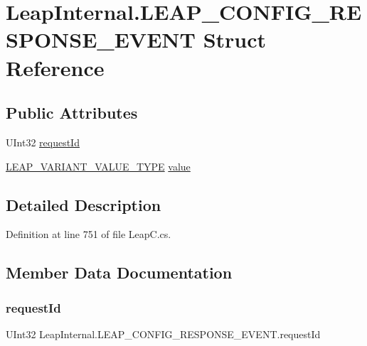 \hypertarget{struct_leap_internal_1_1_l_e_a_p___c_o_n_f_i_g___r_e_s_p_o_n_s_e___e_v_e_n_t}{}\section{Leap\+Internal.\+L\+E\+A\+P\+\_\+\+C\+O\+N\+F\+I\+G\+\_\+\+R\+E\+S\+P\+O\+N\+S\+E\+\_\+\+E\+V\+E\+NT Struct Reference}
\label{struct_leap_internal_1_1_l_e_a_p___c_o_n_f_i_g___r_e_s_p_o_n_s_e___e_v_e_n_t}
\subsection*{Public Attributes}
\begin{DoxyCompactItemize}
\item 
U\+Int32 \mbox{\hyperlink{struct_leap_internal_1_1_l_e_a_p___c_o_n_f_i_g___r_e_s_p_o_n_s_e___e_v_e_n_t_a199913488104b8861fb23bed170302e9}{request\+Id}}
\item 
\mbox{\hyperlink{struct_leap_internal_1_1_l_e_a_p___v_a_r_i_a_n_t___v_a_l_u_e___t_y_p_e}{L\+E\+A\+P\+\_\+\+V\+A\+R\+I\+A\+N\+T\+\_\+\+V\+A\+L\+U\+E\+\_\+\+T\+Y\+PE}} \mbox{\hyperlink{struct_leap_internal_1_1_l_e_a_p___c_o_n_f_i_g___r_e_s_p_o_n_s_e___e_v_e_n_t_a776be401a128a9e99b586bb5edc5140c}{value}}
\end{DoxyCompactItemize}


\subsection{Detailed Description}


Definition at line 751 of file Leap\+C.\+cs.



\subsection{Member Data Documentation}
\mbox{\label{struct_leap_internal_1_1_l_e_a_p___c_o_n_f_i_g___r_e_s_p_o_n_s_e___e_v_e_n_t_a199913488104b8861fb23bed170302e9}} 
\subsubsection{\texorpdfstring{requestId}{requestId}}
{\footnotesize\ttfamily U\+Int32 Leap\+Internal.\+L\+E\+A\+P\+\_\+\+C\+O\+N\+F\+I\+G\+\_\+\+R\+E\+S\+P\+O\+N\+S\+E\+\_\+\+E\+V\+E\+N\+T.\+request\+Id}



